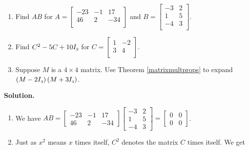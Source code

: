 \documentclass{ximera}
\begin{document}
\begin{example} \label{matrixmultex}  $~$

\begin{enumerate}

\item  Find $AB$ for $A = \left[ \begin{array}{rrr} -23 & -1 & 17 \\ 46 & 2 & -34 \\ \end{array} \right]$ and $B = \left[ \begin{array}{rr} -3 & 2 \\ 1 & 5 \\ -4 & 3 \\ \end{array} \right]$.


\item  Find $C^2 -5C + 10I_{\mbox{\tiny$2$}}$ for $C = \left[ \begin{array}{rr} 1 & -2 \\ 3 & 4 \\ \end{array} \right]$.

\item  Suppose $M$ is a $4 \times 4$ matrix.  Use Theorem \ref{matrixmultprops} to expand $\left(M - 2I_{\mbox{\tiny$4$}}\right)\left(M + 3I_{\mbox{\tiny$4$}}\right)$.


\end{enumerate}

{\bf Solution.}  

\begin{enumerate}

\item  We have $AB = \left[ \begin{array}{rrr} -23 & -1 & 17 \\ 46 & 2 & -34  \end{array} \right] \left[ \begin{array}{rr} -3 & 2 \\ 1 & 5 \\ -4 & 3  \end{array} \right] =  \left[ \begin{array}{rr} 0 & 0 \\ 0 & 0  \end{array} \right] $.


\item Just as $x^2$ means $x$ times itself, $C^2$ denotes the matrix $C$ times itself.  We get


\end{enumerate}
\end{example}
\end{document}
